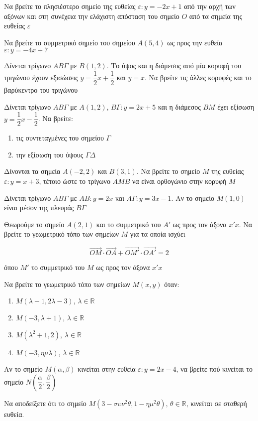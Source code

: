 \documentclass{../../presentation}
\begin{document}
\begin{askisi}
  Να βρείτε το πλησιέστερο σημείο της ευθείας $ε:y=-2x+1$ από την αρχή των αξόνων και στη συνέχεια την ελάχιστη απόσταση του σημείο $Ο$ από τα σημεία της ευθείας $ε$
\end{askisi}

\begin{askisi}
  Να βρείτε το συμμετρικό σημείο του σημείου $Α(5,4)$ ως προς την ευθεία $ε:y=-4x+7$
\end{askisi}

\begin{askisi}
  Δίνεται τρίγωνο $ΑΒΓ$ με $Β(1,2)$. Το ύψος και η διάμεσος από μία κορυφή του τριγώνου έχουν εξισώσεις $y=\dfrac{1}{2}x+\dfrac{1}{2}$ και $y=x$. Να βρείτε τις άλλες κορυφές και το βαρύκεντρο του τριγώνου
\end{askisi}

\begin{askisi}
  Δίνεται τρίγωνο $ΑΒΓ$ με $Α(1,2)$, $ΒΓ:y=2x+5$ και η διάμεσος $ΒΜ$ έχει εξίσωση $y=\dfrac{1}{2}x-\dfrac{1}{2}$. Να βρείτε:
  \begin{enumerate}[<+->]
    \item τις συντεταγμένες του σημείου $Γ$
    \item την εξίσωση του ύψους $ΓΔ$
  \end{enumerate}
\end{askisi}

\begin{askisi}
  Δίνονται τα σημεία $Α(-2,2)$ και $Β(3,1)$. Να βρείτε το σημείο $Μ$ της ευθείας $ε:y=x+3$, τέτοιο ώστε το τρίγωνο $ΑΜΒ$ να είναι ορθογώνιο στην κορυφή $Μ$
\end{askisi}

\begin{askisi}
  Δίνεται τρίγωνο $ΑΒΓ$ με $ΑΒ:y=2x$ και $ΑΓ:y=3x-1$. Αν το σημείο $Μ(1,0)$ είναι μέσον της πλευράς $ΒΓ$
\end{askisi}

\begin{askisi}
  Θεωρούμε το σημείο $Α(2,1)$ και το συμμετρικό του $Α'$ ως προς τον άξονα $x'x$. Να βρείτε το γεωμετρικό τόπο των σημείων $Μ$ για τα οποία ισχύει

  $$\overrightarrow{ΟΜ}\cdot\overrightarrow{ΟΑ}+\overrightarrow{ΟΜ'}\cdot\overrightarrow{ΟΑ'}=2$$

  όπου $Μ'$ το συμμετρικό του $Μ$ ως προς τον άξονα $x'x$
\end{askisi}

\begin{askisi}
  Να βρείτε το γεωμετρικό τόπο των σημείων $Μ(x,y)$ όταν:
  \begin{enumerate}[<+->]
    \item $Μ(λ-1,2λ-3)$, $λ\in\mathbb{R}$
    \item $Μ(-3,λ+1)$, $λ\in\mathbb{R}$
    \item $Μ(λ^2+1,2)$, $λ\in\mathbb{R}$
    \item $Μ(-3,ημλ)$, $λ\in\mathbb{R}$
  \end{enumerate}
\end{askisi}

\begin{askisi}
  Αν το σημείο $Μ(α,β)$ κινείται στην ευθεία $ε:y=2x-4$, να βρείτε πού κινείται το σημείο $Ν\left(  \dfrac{α}{2},\dfrac{β}{2}\right)$
\end{askisi}

\begin{askisi}
  Να αποδείξετε ότι το σημείο $Μ(3-συν^2θ,1-ημ^2θ)$, $θ\in\mathbb{R}$, κινείται σε σταθερή ευθεία.
\end{askisi}
\end{document}
